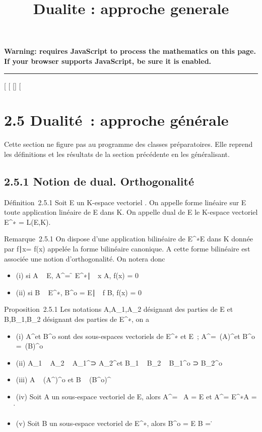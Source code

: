 \documentclass[]{article}
\title{Dualite : approche generale}
\author{}
\date{}
\begin{document}
\maketitle

\textbf{Warning: 
requires JavaScript to process the mathematics on this page.\\ If your
browser supports JavaScript, be sure it is enabled.}

\begin{center}\rule{3in}{0.4pt}\end{center}

[
[
[]
[

\section{2.5 Dualité~: approche générale}

Cette section ne figure pas au programme des classes préparatoires. Elle
reprend les définitions et les résultats de la section précédente en les
généralisant.

\subsection{2.5.1 Notion de dual. Orthogonalité}

Définition~2.5.1 Soit E un K-espace vectoriel . On appelle forme
linéaire sur E toute application linéaire de E dans K. On appelle dual
de E le K-espace vectoriel E^∗ = L(E,K).

Remarque~2.5.1 On dispose d'une application bilinéaire de
E^∗\times E dans K donnée par \langle
f∣x\rangle = f(x) appelée la
forme bilinéaire canonique. A cette forme bilinéaire est associée une
notion d'orthogonalité. On notera donc

\begin{itemize}
\itemsep1pt\parskip0pt
\item
  (i) si A \subset~ E, A^\bot = \f \in
  E^∗∣\forall~~x
  \in A, f(x) = 0\
\item
  (ii) si B \subset~ E^∗, B^o = \x \in
  E∣\forall~~f \in B, f(x) =
  0\
\end{itemize}

Proposition~2.5.1 Les notations A,A_1,A_2 désignant
des parties de E et B,B_1,B_2 désignant des parties de
E^∗, on a

\begin{itemize}
\itemsep1pt\parskip0pt
\item
  (i) A^\bot et B^o sont des sous-espaces vectoriels
  de E^∗ et E~; A^\bot =\
  \mathrmVect(A)^\bot et B^o
  =\
  \mathrmVect(B)^o
\item
  (ii) A_1 \subset~ A_2 \rigtharrow~ A_1^\bot⊃
  A_2^\bot et B_1 \subset~ B_2 \rigtharrow~
  B_1^o ⊃ B_2^o
\item
  (iii) A \subset~ (A^\bot)^o et B \subset~
  (B^o)^\bot
\item
  (iv) Soit A un sous-espace vectoriel de E, alors A^\bot =
  \0\ \Leftrightarrow A =
  E et A^\bot = E^∗\Leftrightarrow A =
  \0\.
\item
  (v) Soit B un sous-espace vectoriel de E^∗, alors
  B^o = E \Leftrightarrow B =
  \0\.
\end{itemize}
\end{document}
